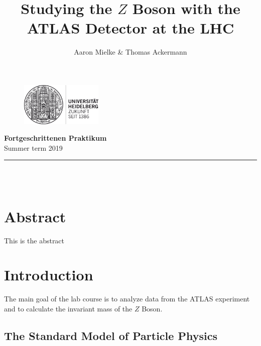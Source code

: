 \documentclass[12pt, a4paper, bibliography=totoc]{scrreprt}
\title{Studying the $Z$ Boson with the ATLAS Detector at the LHC}
\author{Aaron Mielke \& Thomas Ackermann}
\begin{document}
\begin{center}
	\makeatletter
	\thispagestyle{empty}
	
	\begin{figure}[H]
	\flushright
	\includegraphics[width=0.35\textwidth]{fig/logo}
	\end{figure}
	
	\vspace{-30mm}
	
	\begin{flushleft}
	\large{\textbf{Fortgeschrittenen Praktikum} \\
		Summer term 2019} \\
	\end{flushleft}
	
	\vspace{5mm}
	
	\rule{\textwidth}{0.2pt}

	\vspace{50mm}
	\Huge\textbf{\@title} \\
	\vspace{10mm}
	\large{\@author} \\
	\normalfont
	
	\vspace{2mm}
	
	\makeatother
\end{center}

\normalsize
\newpage

\tableofcontents


\chapter*{Abstract}
This is the abstract





\chapter{Introduction}

The main goal of the lab course is to analyze data from the ATLAS experiment and 
to calculate the invariant mass of the $Z$ Boson. 

\section{The Standard Model of Particle Physics}
\end{document}
